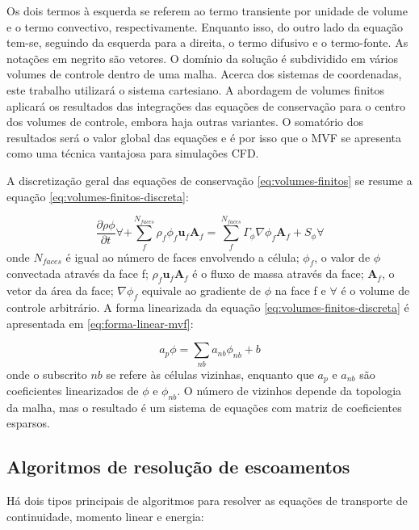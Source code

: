 Os dois termos à esquerda se referem ao termo transiente por unidade de volume e o termo convectivo, respectivamente. Enquanto isso, do outro lado da equação tem-se, seguindo da esquerda para a direita, o termo difusivo e o termo-fonte. As notações em negrito são vetores. O domínio da solução é subdividido em vários volumes de controle dentro de uma malha. Acerca dos sistemas de coordenadas, este trabalho utilizará o sistema cartesiano. A abordagem de volumes finitos aplicará os resultados das integrações das equações de conservação para o centro dos volumes de controle, embora haja outras variantes. O somatório dos resultados será o valor global das equações e é por isso que o MVF se apresenta como uma técnica vantajosa para simulações CFD.

A discretização geral das equações de conservação \ref{eq:volumes-finitos} se resume a equação \ref{eq:volumes-finitos-discreta}:

\begin{equation}
    \label{eq:volumes-finitos-discreta}
    \frac{\partial \rho\phi}{\partial t}\forall + \sum_{f}^{N_{faces}}\rho_{f}\phi_{f}\boldsymbol{u}_f\boldsymbol{A}_{f} = \sum_{f}^{N_{faces}}\Gamma_{\phi}\nabla\phi_{f}\boldsymbol{A}_{f} + S_{\phi}\forall
\end{equation}
%
onde \(N_{faces}\) é igual ao número de faces envolvendo a célula; \(\phi_f\), o valor de \(\phi\) convectada através da face f; \(\rho_f\boldsymbol{u}_f\textbf{A}_f\) é o fluxo de massa através da face; \(\textbf{A}_f\), o vetor da área da face; \(\nabla\phi_f\) equivale ao gradiente de \(\phi\) na face f e \(\forall\) é o volume de controle arbitrário. A forma linearizada da equação \ref{eq:volumes-finitos-discreta} é apresentada em \ref{eq:forma-linear-mvf}:

\begin{equation}
    \label{eq:forma-linear-mvf}
    a_{p}\phi = \sum_{nb}a_{nb}\phi_{nb} + b
\end{equation}
%
onde o subscrito \(nb\) se refere às células vizinhas, enquanto que \(a_{p}\) e \(a_{nb}\) são coeficientes linearizados de \(\phi\) e \(\phi_{nb}\). O número de vizinhos depende da topologia da malha, mas o resultado é um sistema de equações com matriz de coeficientes esparsos.

\subsection{Algoritmos de resolução de escoamentos}

Há dois tipos principais de algoritmos para resolver as equações de transporte de continuidade, momento linear e energia:

